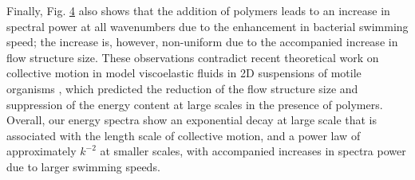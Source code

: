 \documentclass[aps,prl,floatfix,footinbib,twocolumn,superscriptaddress]{revtex4-1}
\begin{document}


Finally, Fig. \hyperref[fig4]{4} also shows that the addition of polymers leads to an increase in spectral power at all wavenumbers due to the enhancement in bacterial swimming speed; the increase is, however, non-uniform due to the accompanied increase in flow structure size. These observations contradict recent theoretical work on collective motion in model viscoelastic fluids in 2D suspensions of motile organisms \cite{underhill_PRE_2011,Underhill_JNNFM_2014,Li_PRL_2016}, which predicted the reduction of the flow structure size and suppression of the energy content at large scales in the presence of polymers. Overall, our energy spectra show an exponential decay at large scale that is associated with the length scale of collective motion, and a power law of approximately $k^{-2}$ at smaller scales, with accompanied increases in spectra power due to larger swimming speeds.
\end{document}
